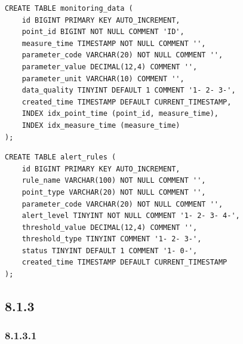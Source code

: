 \begin{lstlisting}[style=sql]
CREATE TABLE monitoring_data (
    id BIGINT PRIMARY KEY AUTO_INCREMENT,
    point_id BIGINT NOT NULL COMMENT 'ID',
    measure_time TIMESTAMP NOT NULL COMMENT '',
    parameter_code VARCHAR(20) NOT NULL COMMENT '',
    parameter_value DECIMAL(12,4) COMMENT '',
    parameter_unit VARCHAR(10) COMMENT '',
    data_quality TINYINT DEFAULT 1 COMMENT '1- 2- 3-',
    created_time TIMESTAMP DEFAULT CURRENT_TIMESTAMP,
    INDEX idx_point_time (point_id, measure_time),
    INDEX idx_measure_time (measure_time)
);
\end{lstlisting}

\begin{lstlisting}[style=sql]
CREATE TABLE alert_rules (
    id BIGINT PRIMARY KEY AUTO_INCREMENT,
    rule_name VARCHAR(100) NOT NULL COMMENT '',
    point_type VARCHAR(20) NOT NULL COMMENT '',
    parameter_code VARCHAR(20) NOT NULL COMMENT '',
    alert_level TINYINT NOT NULL COMMENT '1- 2- 3- 4-',
    threshold_value DECIMAL(12,4) COMMENT '',
    threshold_type TINYINT COMMENT '1- 2- 3-',
    status TINYINT DEFAULT 1 COMMENT '1- 0-',
    created_time TIMESTAMP DEFAULT CURRENT_TIMESTAMP
);
\end{lstlisting}

\hypertarget{section-42}{%
\subsection{8.1.3}\label{section-42}}

\hypertarget{section-43}{%
\subsubsection{8.1.3.1}\label{section-43}}

\hypertarget{section-44}{%
\paragraph{}\label{section-44}}

